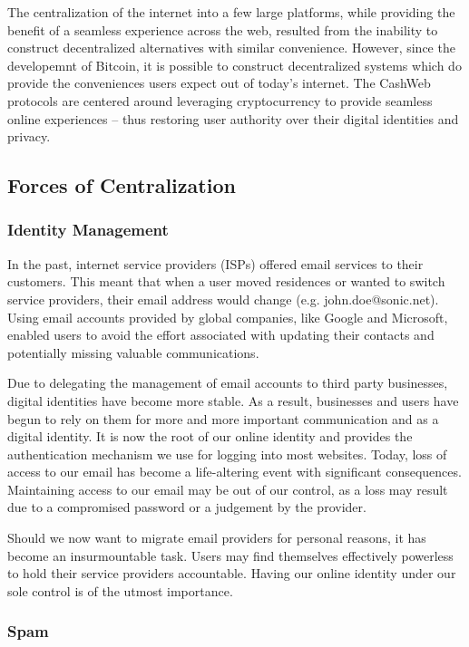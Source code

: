 \documentclass{article}
\begin{document}
The centralization of the internet into a few large platforms, while providing the benefit of a seamless experience across the web, resulted from the inability to construct decentralized alternatives with similar convenience. However, since the developemnt of Bitcoin\cite{nakamoto2008bpp}, it is possible to construct decentralized systems which do provide the conveniences users expect out of today's internet. The CashWeb protocols are centered around leveraging cryptocurrency to provide seamless online experiences -- thus restoring user authority over their digital identities and privacy. 

\subsection{Forces of Centralization}

\subsubsection{Identity Management}

In the past, internet service providers (ISPs) offered email services to their customers. This meant that when a user moved residences or wanted to switch service providers, their email address would change (e.g. john.doe@sonic.net). Using email accounts provided by global companies, like Google and Microsoft, enabled users to avoid the effort associated with updating their contacts and potentially missing valuable communications.

Due to delegating the management of email accounts to third party businesses, digital identities have become more stable. As a result, businesses and users have begun to rely on them for more and more important communication and as a digital identity. It is now the root of our online identity and provides the authentication mechanism we use for logging into most websites. Today, loss of access to our email has become a life-altering event with significant consequences. Maintaining access to our email may be out of our control, as a loss may result due to a compromised password or a judgement by the provider. 

Should we now want to migrate email providers for personal reasons, it has become an insurmountable task. Users may find themselves effectively powerless to hold their service providers accountable. Having our online identity under our sole control is of the utmost importance.

\subsubsection{Spam}
\end{document}

